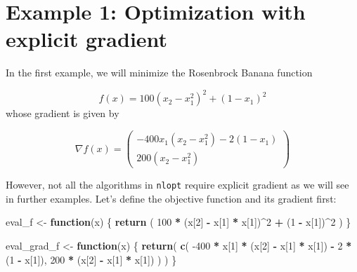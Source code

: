 \documentclass[onecolumn]{article}
\newenvironment{Shaded}{\begin{snugshade}}{\end{snugshade}}
\newcommand{\KeywordTok}[1]{\textcolor[rgb]{0.13,0.29,0.53}{\textbf{#1}}}
\newcommand{\DecValTok}[1]{\textcolor[rgb]{0.00,0.00,0.81}{#1}}
\newcommand{\StringTok}[1]{\textcolor[rgb]{0.31,0.60,0.02}{#1}}
\newcommand{\ControlFlowTok}[1]{\textcolor[rgb]{0.13,0.29,0.53}{\textbf{#1}}}
\newcommand{\OperatorTok}[1]{\textcolor[rgb]{0.81,0.36,0.00}{\textbf{#1}}}
\newcommand{\NormalTok}[1]{#1}
\begin{document}
\section{Example 1: Optimization with explicit
gradient}\label{example-1-optimization-with-explicit-gradient}

In the first example, we will minimize the Rosenbrock Banana function

\[
f(x) = 100 (x_2 - x_1^2)^2 + (1-x_1)^2
\] whose gradient is given by

\[
\nabla f(x) = \begin{pmatrix} -400x_1 (x_2 - x_1^2) - 2(1-x_1) \\ 200(x_2 - x_1^2)  \end{pmatrix}
\]

However, not all the algorithms in \texttt{nlopt} require explicit
gradient as we will see in further examples. Let's define the objective
function and its gradient first:

\begin{Shaded}
\begin{Highlighting}[]
\NormalTok{eval_f <-}\StringTok{ }\ControlFlowTok{function}\NormalTok{(x)}
\NormalTok{\{}
    \KeywordTok{return}\NormalTok{ ( }\DecValTok{100} \OperatorTok{*}\StringTok{ }\NormalTok{(x[}\DecValTok{2}\NormalTok{] }\OperatorTok{-}\StringTok{ }\NormalTok{x[}\DecValTok{1}\NormalTok{] }\OperatorTok{*}\StringTok{ }\NormalTok{x[}\DecValTok{1}\NormalTok{])}\OperatorTok{^}\DecValTok{2} \OperatorTok{+}\StringTok{ }\NormalTok{(}\DecValTok{1} \OperatorTok{-}\StringTok{ }\NormalTok{x[}\DecValTok{1}\NormalTok{])}\OperatorTok{^}\DecValTok{2}\NormalTok{ )}
\NormalTok{\}}


\NormalTok{eval_grad_f <-}\StringTok{ }\ControlFlowTok{function}\NormalTok{(x) \{}
\KeywordTok{return}\NormalTok{( }\KeywordTok{c}\NormalTok{( }\DecValTok{-400} \OperatorTok{*}\StringTok{ }\NormalTok{x[}\DecValTok{1}\NormalTok{] }\OperatorTok{*}\StringTok{ }\NormalTok{(x[}\DecValTok{2}\NormalTok{] }\OperatorTok{-}\StringTok{ }\NormalTok{x[}\DecValTok{1}\NormalTok{] }\OperatorTok{*}\StringTok{ }\NormalTok{x[}\DecValTok{1}\NormalTok{]) }\OperatorTok{-}\StringTok{ }\DecValTok{2} \OperatorTok{*}\StringTok{ }\NormalTok{(}\DecValTok{1} \OperatorTok{-}\StringTok{ }\NormalTok{x[}\DecValTok{1}\NormalTok{]),}
\DecValTok{200} \OperatorTok{*}\StringTok{ }\NormalTok{(x[}\DecValTok{2}\NormalTok{] }\OperatorTok{-}\StringTok{ }\NormalTok{x[}\DecValTok{1}\NormalTok{] }\OperatorTok{*}\StringTok{ }\NormalTok{x[}\DecValTok{1}\NormalTok{]) ) )}
\NormalTok{\}}
\end{Highlighting}
\end{Shaded}
\end{document}
